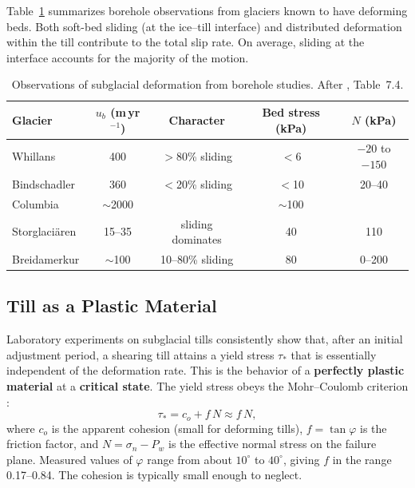 \documentclass[11pt]{article}
\begin{document}
Table~\ref{tab:deforming_beds} summarizes borehole observations from glaciers known to have deforming beds.  Both soft-bed sliding (at the ice--till interface) and distributed deformation within the till contribute to the total slip rate.  On average, sliding at the interface accounts for the majority of the motion.

\begin{table}[ht]
\centering
\caption{Observations of subglacial deformation from borehole studies.  After \cite{CuffeyPaterson2010}, Table~7.4.}
\label{tab:deforming_beds}
\begin{tabular}{lcccc}
\toprule
\textbf{Glacier} & $u_b$ (m\,yr$^{-1}$) & \textbf{Character} & \textbf{Bed stress} (kPa) & $N$ (kPa) \\
\midrule
Whillans & 400 & $>$80\% sliding & $<$6 & $-20$ to $-150$ \\
Bindschadler & 360 & $<$20\% sliding & $<$10 & 20--40 \\
Columbia & $\sim$2000 & & $\sim$100 & \\
Storglaci\"aren & 15--35 & sliding dominates & 40 & 110 \\
Breidamerkur & $\sim$100 & 10--80\% sliding & 80 & 0--200 \\
\bottomrule
\end{tabular}
\end{table}

\subsection{Till as a Plastic Material}
\label{sec:till_plastic}

Laboratory experiments on subglacial tills consistently show that, after an initial adjustment period, a shearing till attains a yield stress $\tau_*$ that is essentially independent of the deformation rate.  This is the behavior of a \textbf{perfectly plastic material} at a \textbf{critical state}.  The yield stress obeys the Mohr--Coulomb criterion \cite{Iversonetal1998}:
\begin{equation}
  \boxed{\tau_* = c_o + f\,N \approx f\,N,}
  \label{eq:mohr_coulomb}
\end{equation}
where $c_o$ is the apparent cohesion (small for deforming tills), $f = \tan\varphi$ is the friction factor, and $N = \sigma_n - P_w$ is the effective normal stress on the failure plane.  Measured values of $\varphi$ range from about $10^\circ$ to $40^\circ$, giving $f$ in the range 0.17--0.84.  The cohesion is typically small enough to neglect.
\end{document}
